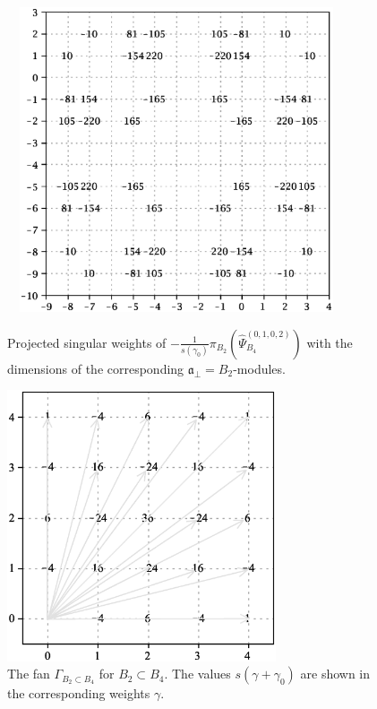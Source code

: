 \documentclass[12pt]{iopart}
\theoremstyle{definition}
\newcommand{\afb}{\mathfrak{a}_{\bot}}
\begin{document}
\begin{figure}[pt]
  \centering
    \includegraphics[width=100mm,height=90mm]{figure4.eps}
  \caption{Projected singular weights of $-\frac{1}{s(\gamma_0)}\pi_{B_2}\left(\hat \Psi^{(0,1,0,2)}_{B_4}\right)$
  with the dimensions of the corresponding $\afb=B_2$-modules.}
  \label{fig:B4B2anom}

%
  \centering
  \includegraphics[height=80mm]{figure5.eps}
  \caption{The fan $\Gamma_{B_2\subset B_4}$ for $B_2\subset B_4$. The values $s(\gamma+\gamma_0)$ are shown in the corresponding weights $\gamma$.}
  \label{fig:B4B2Fan}
\end{figure}
\end{document}
